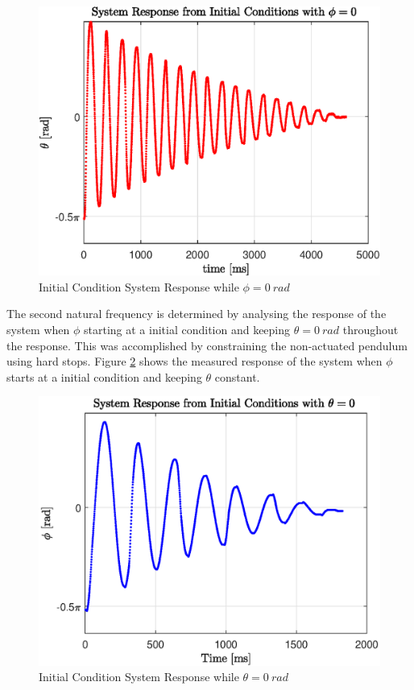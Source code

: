 \begin{figure}[h]
	\centering
	\includegraphics[scale=1]{./figs/q1_initial_response.eps}
	\caption{Initial Condition System Response while $ \phi = \SI{0}{rad} $ }
	\label{fig:q1_response}
\end{figure}


The second natural frequency is determined by analysing the response of the system when $\phi$ starting at a initial condition and keeping $\theta = \SI{0}{rad}$ throughout the response. This was accomplished by constraining the non-actuated pendulum using hard stops. Figure \ref{fig:q2_response} shows the measured response of the system when $\phi$ starts at a initial condition and keeping $\theta$ constant.

\begin{figure}[h]
	\centering
	\includegraphics[scale=1]{./figs/q2_initial_response.eps}
	\caption{Initial Condition System Response while $ \theta = \SI{0}{rad} $ }
	\label{fig:q2_response}
\end{figure}

